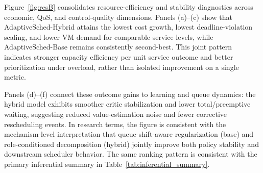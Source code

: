 \documentclass[journal]{IEEEtran}
\begin{document}
Figure~\ref{fig:resB} consolidates resource-efficiency and stability diagnostics across economic, QoS, and control-quality dimensions. Panels (a)--(c) show that AdaptiveSched-Hybrid attains the lowest cost growth, lowest deadline-violation scaling, and lower VM demand for comparable service levels, while AdaptiveSched-Base remains consistently second-best. This joint pattern indicates stronger capacity efficiency per unit service outcome and better prioritization under overload, rather than isolated improvement on a single metric.

Panels (d)--(f) connect these outcome gains to learning and queue dynamics: the hybrid model exhibits smoother critic stabilization and lower total/preemptive waiting, suggesting reduced value-estimation noise and fewer corrective rescheduling events. In research terms, the figure is consistent with the mechanism-level interpretation that queue-shift-aware regularization (base) and role-conditioned decomposition (hybrid) jointly improve both policy stability and downstream scheduler behavior. The same ranking pattern is consistent with the primary inferential summary in Table~\ref{tab:inferential_summary}.
\end{document}
